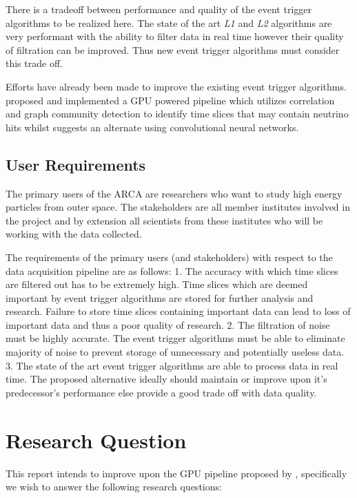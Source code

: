 There is a tradeoff between performance and quality of the event trigger
algorithms to be realized here. The state of the art \emph{L1} and \emph{L2}
algorithms are very performant with the ability to filter data in real time
however their quality of filtration can be improved. Thus new event trigger
algorithms must consider this trade off.

Efforts have already been made to improve the existing event trigger
algorithms. \cite{karas2019data} proposed and implemented a GPU powered
pipeline which utilizes correlation and graph community detection to identify
time slices that may contain neutrino hits whilst \cite{post2019km3nnet}
suggests an alternate using convolutional neural networks.

\subsection{User Requirements}\label{user-requirements}

The primary users of the ARCA are researchers who want to study high energy
particles from outer space. The stakeholders are all member institutes involved
in the project and by extension all scientists from these institutes who will
be working with the data collected.

The requirements of the primary users (and stakeholders) with respect to the
data acquisition pipeline are as follows: 1. The accuracy with which time
slices are filtered out has to be extremely high. Time slices which are deemed
important by event trigger algorithms are stored for further analysis and
research. Failure to store time slices containing important data can lead to
loss of important data and thus a poor quality of research. 2. The filtration
of noise must be highly accurate. The event trigger algorithms must be able to
eliminate majority of noise to prevent storage of unnecessary and potentially
useless data. 3. The state of the art event trigger algorithms are able to
process data in real time. The proposed alternative ideally should maintain or
improve upon it's predecessor's performance else provide a good trade off with
data quality.

\section{Research Question}

This report intends to improve upon the GPU pipeline proposed by
\cite{karas2019data}, specifically we wish to answer the following research
questions:

